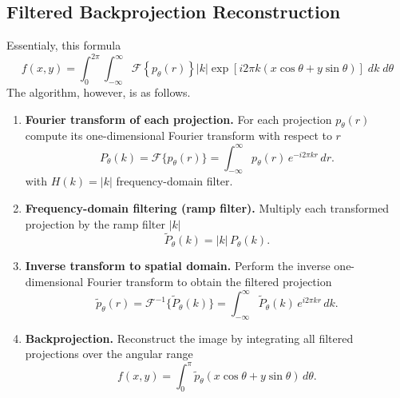 \documentclass[../../../main.tex]{subfiles}
\begin{document}
\subsection{Filtered Backprojection Reconstruction}
Essentialy, this formula
\begin{equation*}
    f(x,y) = \int_{0}^{2\pi}\int_{-\infty }^{\infty}\mathcal{F} \left\{ p_\theta(r) \right\} |k| \exp \left[{i 2\pi k (x\cos\theta + y\sin\theta)}\right] \; dk \; d\theta
\end{equation*}
The algorithm, however, is as follows.
\begin{enumerate}
    \item \textbf{Fourier transform of each projection.}
          For each projection $p_\theta(r)$ compute its one-dimensional Fourier transform with respect to $r$
          \[
              P_{\theta}(k) = \mathcal{F}\{p_{\theta}(r)\}
              = \int_{-\infty}^{\infty} p_{\theta}(r)\, e^{-i2\pi kr}\,dr.
          \]
          with $H(k)=|k|$ frequency-domain filter.

    \item \textbf{Frequency-domain filtering (ramp filter).} Multiply each transformed projection by the ramp filter $|k|$
          \[
              \tilde{P}_{\theta}(k) = |k|\, P_{\theta}(k).
          \]

    \item \textbf{Inverse transform to spatial domain.}
          Perform the inverse one-dimensional Fourier transform to obtain the filtered projection
          \[
              \tilde{p}_{\theta}(r) = \mathcal{F}^{-1}\{\tilde{P}_{\theta}(k)\}
              = \int_{-\infty}^{\infty} \tilde{P}_{\theta}(k)\, e^{i2\pi kr}\,dk.
          \]

    \item \textbf{Backprojection.} Reconstruct the image by integrating all filtered projections over the angular range
          \[
              f(x,y) = \int_{0}^{\pi}
              \tilde{p}_{\theta}(x\cos\theta + y\sin\theta)\, d\theta.
          \]
\end{enumerate}
\end{document}
